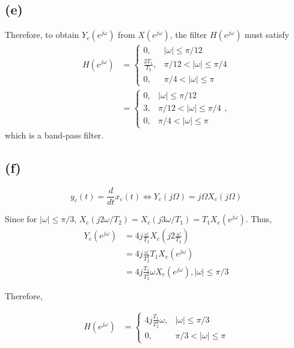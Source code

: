 \documentclass{article}
\begin{document}
\subsection{(e)}

\begin{center}
	\resizebox{\linewidth}{!}{}
\end{center}

Therefore, to obtain $Y_e(e^{j\omega})$ from $X(e^{j\omega})$, the filter $H(e^{j\omega})$ must satisfy
\begin{align} \nonumber
H(e^{j\omega}) &= \begin{cases}
0, & |\omega| \leq \pi/12\\
\frac{2T_1}{T_2}, & \pi/12 < |\omega| \leq \pi/4\\
0, & \pi/4 < |\omega| \leq \pi
\end{cases} \\
&= \begin{cases}
0, & |\omega| \leq \pi/12\\
3, & \pi/12 < |\omega| \leq \pi/4\\
0, & \pi/4 < |\omega| \leq \pi
\end{cases},
\end{align}
which is a band-pass filter.

\subsection{(f)}
\begin{equation}
y_c(t) = \dfrac{d}{dt}x_c(t) \Longleftrightarrow Y_c(j\Omega) = j\Omega X_c(j\Omega)
\end{equation}

\begin{center}
	\resizebox{\linewidth}{!}{}
\end{center}

Since for $|\omega|\leq \pi/3$, $X_c(j2\omega/T_2) = X_c(j3\omega/T_1) = T_1X_e(e^{j\omega})$. Thus,
\begin{align} \nonumber
Y_e(e^{j\omega}) &= 4j\frac{\omega}{T_2}X_c(j2\frac{\omega}{T_2}) \\ \nonumber
&= 4j\frac{\omega}{T_2^2}T_1X_e(e^{j\omega}) \\ 
&= 4j\frac{T_1}{T_2^2}\omega X_e(e^{j\omega}), |\omega|\leq\pi/3 
\end{align}

Therefore,

\begin{align}
H(e^{j\omega}) &= \begin{cases}
4j\frac{T_1}{T_2^2}\omega, & |\omega|\leq \pi/3 \\
0, &\pi/3 < |\omega| \leq \pi
\end{cases}
\end{align}
\end{document}
